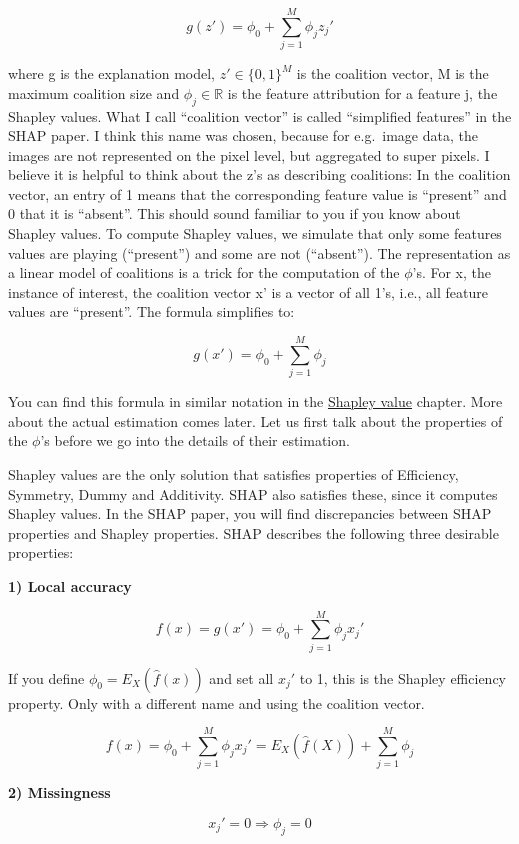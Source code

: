 \documentclass[
  12pt,
]{krantz}
\begin{document}
\[g(z')=\phi_0+\sum_{j=1}^M\phi_jz_j'\]

where g is the explanation model, \(z'\in\{0,1\}^M\) is the coalition vector, M is the maximum coalition size and \(\phi_j\in\mathbb{R}\) is the feature attribution for a feature j, the Shapley values.
What I call ``coalition vector'' is called ``simplified features'' in the SHAP paper.
I think this name was chosen, because for e.g.~image data, the images are not represented on the pixel level, but aggregated to super pixels.
I believe it is helpful to think about the z's as describing coalitions:
In the coalition vector, an entry of 1 means that the corresponding feature value is ``present'' and 0 that it is ``absent''.
This should sound familiar to you if you know about Shapley values.
To compute Shapley values, we simulate that only some features values are playing (``present'') and some are not (``absent'').
The representation as a linear model of coalitions is a trick for the computation of the \(\phi\)'s.
For x, the instance of interest, the coalition vector x' is a vector of all 1's, i.e., all feature values are ``present''.
The formula simplifies to:

\[g(x')=\phi_0+\sum_{j=1}^M\phi_j\]

You can find this formula in similar notation in the \protect\hyperlink{shapley}{Shapley value} chapter.
More about the actual estimation comes later.
Let us first talk about the properties of the \(\phi\)'s before we go into the details of their estimation.

Shapley values are the only solution that satisfies properties of Efficiency, Symmetry, Dummy and Additivity.
SHAP also satisfies these, since it computes Shapley values.
In the SHAP paper, you will find discrepancies between SHAP properties and Shapley properties.
SHAP describes the following three desirable properties:

\textbf{1) Local accuracy}

\[f(x)=g(x')=\phi_0+\sum_{j=1}^M\phi_jx_j'\]

If you define \(\phi_0=E_X(\hat{f}(x))\) and set all \(x_j'\) to 1, this is the Shapley efficiency property.
Only with a different name and using the coalition vector.

\[f(x)=\phi_0+\sum_{j=1}^M\phi_jx_j'=E_X(\hat{f}(X))+\sum_{j=1}^M\phi_j\]

\textbf{2) Missingness}

\[x_j'=0\Rightarrow\phi_j=0\]
\end{document}
